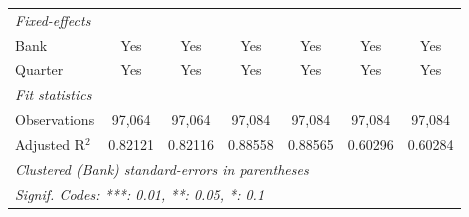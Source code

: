 \begin{tabular}{lcccccc}
   \midrule
   \emph{Fixed-effects}\\
   Bank                           & Yes             & Yes             & Yes            & Yes            & Yes             & Yes\\  
   Quarter                        & Yes             & Yes             & Yes            & Yes            & Yes             & Yes\\  
   \midrule
   \emph{Fit statistics}\\
   Observations                   & 97,064          & 97,064          & 97,084         & 97,084         & 97,084          & 97,084\\  
   Adjusted R$^2$                 & 0.82121         & 0.82116         & 0.88558        & 0.88565        & 0.60296         & 0.60284\\  
   \midrule \midrule
   \multicolumn{7}{l}{\emph{Clustered (Bank) standard-errors in parentheses}}\\
   \multicolumn{7}{l}{\emph{Signif. Codes: ***: 0.01, **: 0.05, *: 0.1}}\\
\end{tabular}
\par\endgroup


